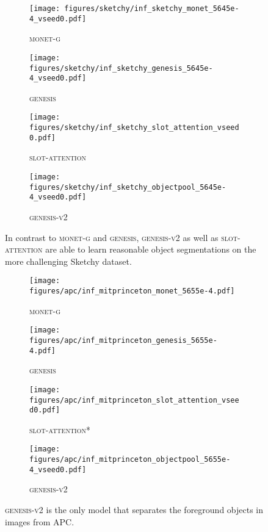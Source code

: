 \documentclass{article}
\begin{document}
\begin{figure}
	\centering
	\begin{subfigure}{0.259\linewidth}
		\texttt{[image: figures/sketchy/inf\_sketchy\_monet\_5645e-4\_vseed0.pdf]}
		\caption{\textsc{monet-g}}
	\end{subfigure}
	\begin{subfigure}{0.24\linewidth}
		\texttt{[image: figures/sketchy/inf\_sketchy\_genesis\_5645e-4\_vseed0.pdf]}
		\caption{\textsc{genesis}}
	\end{subfigure}
	\begin{subfigure}{0.24\linewidth}
		\texttt{[image: figures/sketchy/inf\_sketchy\_slot\_attention\_vseed0.pdf]}
		\caption{\textsc{slot-attention}}
	\end{subfigure}
	\begin{subfigure}{0.24\linewidth}
		\texttt{[image: figures/sketchy/inf\_sketchy\_objectpool\_5645e-4\_vseed0.pdf]}
		\caption{\textsc{genesis-v2}}
	\end{subfigure}
	\caption{In contrast to \textsc{monet-g} and \textsc{genesis}, \textsc{genesis-v2} as well as \textsc{slot-attention} are able to learn reasonable object segmentations on the more challenging Sketchy dataset.}
	\label{fig:gpp:sketchy:seg}
\end{figure}
\begin{figure}
	\centering
	\begin{subfigure}{0.259\linewidth}
		\texttt{[image: figures/apc/inf\_mitprinceton\_monet\_5655e-4.pdf]}
		\caption{\textsc{monet-g}}
	\end{subfigure}
	\begin{subfigure}{0.24\linewidth}
		\texttt{[image: figures/apc/inf\_mitprinceton\_genesis\_5655e-4.pdf]}
		\caption{\textsc{genesis}}
	\end{subfigure}
	\begin{subfigure}{0.24\linewidth}
		\texttt{[image: figures/apc/inf\_mitprinceton\_slot\_attention\_vseed0.pdf]}
		\caption{\textsc{slot-attention}*}
	\end{subfigure}
	\begin{subfigure}{0.24\linewidth}
		\texttt{[image: figures/apc/inf\_mitprinceton\_objectpool\_5655e-4\_vseed0.pdf]}
		\caption{\textsc{genesis-v2}}
	\end{subfigure}
	\caption{\textsc{genesis-v2} is the only model that separates the foreground objects in images from APC.}
	\label{fig:gpp:apc:seg}
\end{figure}
\end{document}
